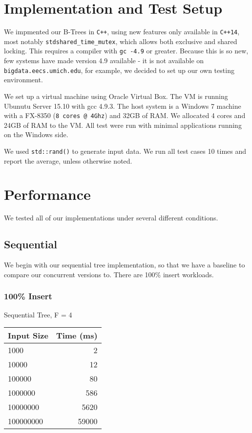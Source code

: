 \documentclass{sig-alternate}
\begin{document}
\section{Implementation and Test Setup}
We impmented our B-Trees in \texttt{C++}, using new features only available in \texttt{C++14}, most notably \texttt{stdshared\_time\_mutex}, which allows both exclusive and shared locking.  This requires a compiler with \texttt{gc -4.9} or greater.  Because this is so new, few systems have made version 4.9 available - it is not available on \texttt{bigdata.eecs.umich.edu}, for example, we decided to set up our own testing environment.

We set up a virtual machine using Oracle Virtual Box.  The VM is running Ubunutu Server 15.10 with gcc 4.9.3.  The host system is a Windows 7 machine with a FX-8350 (\texttt{8 cores @ 4Ghz}) and 32GB of RAM.  We allocated 4 cores and 24GB of RAM to the VM.  All test were run with minimal applications running on the Windows side.

We used \texttt{std::rand()} to generate input data.  
We run all test cases 10 times and report the average, unless otherwise noted.

\section{Performance}
We tested all of our implementations under several different conditions.

\subsection{Sequential}
We begin with our sequential tree implementation, so that we have a baseline to compare our concurrent versions to.  There are 100\% insert workloads.
\subsubsection{100\% Insert}
Sequential Tree, F = 4\\
\begin{tabular}{| l | r |}
  \hline
  Input Size & Time (ms)\\  \hline
  1000			&	2	\\
  10000			&	12	\\
  100000		&	80	\\
  1000000		&	586	\\
  10000000		&	5620	\\
  100000000		&	59000	\\
  \hline
\end{tabular} \\
\end{document}
